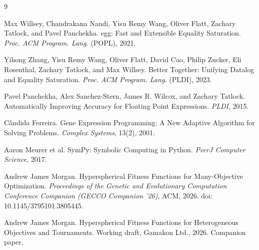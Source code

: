 \documentclass[sigconf]{acmart}
\begin{document}
\begin{thebibliography}{9}

Max Willsey, Chandrakana Nandi, Yisu Remy Wang, Oliver Flatt, Zachary Tatlock,
and Pavel Panchekha.
\newblock egg: Fast and Extensible Equality Saturation.
\newblock \emph{Proc. ACM Program. Lang.} (POPL), 2021.

Yihong Zhang, Yisu Remy Wang, Oliver Flatt, David Cao, Philip Zucker, Eli
Rosenthal, Zachary Tatlock, and Max Willsey.
\newblock Better Together: Unifying Datalog and Equality Saturation.
\newblock \emph{Proc. ACM Program. Lang.} (PLDI), 2023.

Pavel Panchekha, Alex Sanchez-Stern, James R. Wilcox, and Zachary Tatlock.
\newblock Automatically Improving Accuracy for Floating Point Expressions.
\newblock \emph{PLDI}, 2015.

C\^{a}ndida Ferreira.
\newblock Gene Expression Programming: A New Adaptive Algorithm for Solving
Problems.
\newblock \emph{Complex Systems}, 13(2), 2001.

Aaron Meurer et al.
\newblock SymPy: Symbolic Computing in Python.
\newblock \emph{PeerJ Computer Science}, 2017.

Andrew James Morgan.
\newblock Hyperspherical Fitness Functions for Many-Objective Optimization.
\newblock \emph{Proceedings of the Genetic and Evolutionary Computation
Conference Companion (GECCO Companion '26)}, ACM, 2026.
\newblock doi: 10.1145/3795101.3805445.

Andrew James Morgan.
\newblock Hyperspherical Fitness Functions for Heterogeneous Objectives and
Tournaments.
\newblock Working draft, Gamakon Ltd., 2026. Companion paper.

\end{thebibliography}
\end{document}
